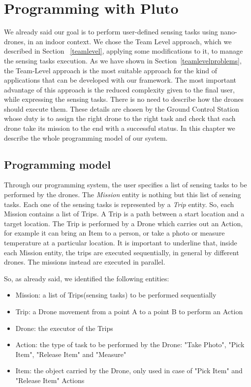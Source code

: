 \chapter{Programming with Pluto}
\label{cap4}

We already said our goal is to perform user-defined sensing tasks using nano-drones, in an indoor context.
We chose the Team Level approach, which we described in Section ~\ref{teamlevel}, applying some modifications to it, to manage the sensing tasks execution.
As we have shown in Section~\ref{teamlevelproblems}, the Team-Level approach is the most suitable approach for the kind of applications that can be developed with our framework.
The most important advantage of this approach is the reduced complexity given to the final user, while expressing the sensing tasks.
There is no need to describe how the drones should execute them.
These details are chosen by the Ground Control Station whose duty is to assign the right drone to the right task and check that each drone take its mission to the end with a successful status.
In this chapter we describe the whole programming model of our system.


\section{Programming model}\label{dataFlow}

Through our programming system, the user specifies a list of sensing tasks to be performed by the drones.
The \textit{Mission} entity is nothing but this list of sensing tasks.
Each one of the sensing tasks is represented by a \textit{Trip} entity.
So, each Mission contains a list of Trips.
A Trip is a path between a start location and a target location.
The Trip is performed by a Drone which carries out an Action, for example it can bring an Item to a person, or take a photo or measure temperature at a particular location.
It is important to underline that, inside each Mission entity, the trips are executed sequentially, in general by different drones.
The missions instead are executed in parallel.


So, as already said, we identified the following entities:

\begin{itemize}
\itemsep2pt
\item{
Mission: a list of Trips(sensing tasks) to be performed sequentially
}
\item{
Trip: a Drone movement from a point A to a point B to perform an Action
}
\item{
Drone: the executor of the Trips
}
\item{
Action: the type of task to be performed by the Drone: "Take Photo", "Pick Item", "Release Item" and "Measure"
}
\item{
Item: the object carried by the Drone, only used in case of "Pick Item" and "Release Item" Actions
}
\end{itemize}


